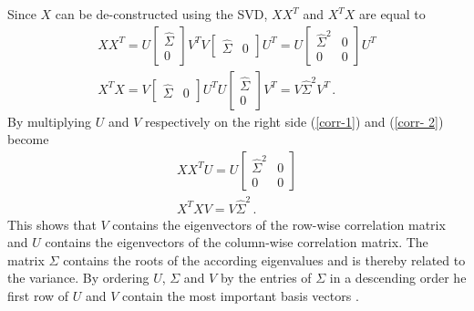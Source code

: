 Since \(X\) can be de-constructed using the SVD, \(XX^{T}\) and \(X^{T}X\) are equal to
\begin{gather}
XX^{T} = U\begin{bmatrix}
\hat{\Sigma} \\
0
\end{bmatrix}V^{T}V\begin{bmatrix}
\hat{\Sigma} & 0
\end{bmatrix}U^{T} = U \begin{bmatrix}
\hat{\Sigma}^{2} & 0 \\
0 & 0
\end{bmatrix} U^{T} \label{corr-1}\\
X^{T}X = V \begin{bmatrix}
\hat{\Sigma} & 0
\end{bmatrix} U^{T}U \begin{bmatrix}
\hat{\Sigma} \\
0
\end{bmatrix} V^{T} = V\hat{\Sigma}^{2}V^{T} \,. \label{corr- 2}
\end{gather}
By multiplying \(U\) and \(V\) respectively on the right side (\ref{corr-1}) and (\ref{corr- 2}) become
\begin{gather}
XX^{T}U = U \begin{bmatrix}
\hat{\Sigma}^{2} & 0 \\
0 & 0
\end{bmatrix} \\
X^{T}XV = V\hat{\Sigma}^{2} \,.
\end{gather}
This shows that \(V\) contains the eigenvectors of the row-wise correlation matrix and \(U\) contains the eigenvectors of the column-wise correlation matrix.
The matrix \(\Sigma\) contains the roots of the according eigenvalues and is thereby related to the variance.
By ordering \(U\), \(\Sigma\) and \(V\) by the entries of \(\Sigma\) in a descending order he first row of \(U\) and \(V\) contain the most important basis vectors \cite{brunton_kutz_2019b}.

